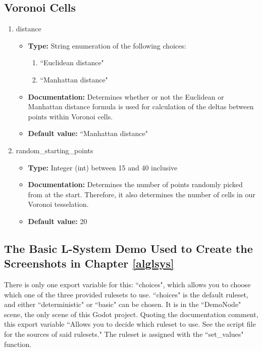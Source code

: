\subsection{Voronoi Cells}

\begin{enumerate}
    \item distance
    \begin{itemize}
        \item \textbf{Type:} String enumeration of the following choices:
        \begin{enumerate}
            \item ``Euclidean distance"
            \item ``Manhattan distance"
        \end{enumerate}
        \item \textbf{Documentation:} Determines whether or not the Euclidean or Manhattan distance formula is used for calculation of the deltas between points within Voronoi cells.
        \item \textbf{Default value:} ``Manhattan distance"
    \end{itemize}
    \item random\_starting\_points
    \begin{itemize}
        \item \textbf{Type:} Integer (int) between 15 and 40 inclusive
        \item \textbf{Documentation:} Determines the number of points randomly picked from at the start. Therefore, it also determines the number of cells in our Voronoi tesselation.
        \item \textbf{Default value:} 20
    \end{itemize}
\end{enumerate}

\subsection{The Basic L-System Demo Used to Create the Screenshots in Chapter \ref{alglsys}}

There is only one export variable for this: ``choices", which allows you to choose which one of the three provided rulesets to use. ``choices" is the default ruleset, and either ``deterministic" or ``basic" can be chosen. It is in the ``DemoNode" scene, the only scene of this Godot project. Quoting the documentation comment, this export variable ``Allows you to decide which ruleset to use. See the script file for the sources of said rulesets." The ruleset is assigned with the ``set\_values" function.

